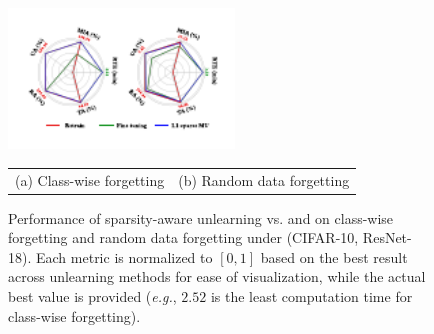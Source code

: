 \begin{figure}
\vspace*{-7.8mm}
\begin{center}
\includegraphics[width=60mm,height=!]{figs/Cifar_l1.pdf}

\vspace*{-1mm}
\begin{tabular}{cc}
{\scriptsize{\hspace*{-1.5mm}(a) Class-wise forgetting}} &{\scriptsize{\hspace*{3mm}(b) Random data forgetting}}
\end{tabular}
\end{center}
\vspace*{-2.5mm}


\caption{\footnotesize{
 Performance   of sparsity-aware unlearning vs. {\FT} and {\retrain} on class-wise forgetting and random data forgetting under (CIFAR-10, ResNet-18). 
 Each   metric is normalized to $[0,1]$ based on the best result  across unlearning methods 
  for ease of visualization, while the actual best value  is provided (\textit{e.g.}, $2.52$  is the  least computation time for class-wise forgetting). 
}
}
  \label{fig: results_l1_sparse_unlearn}
\vspace*{-7mm}
\end{figure}




